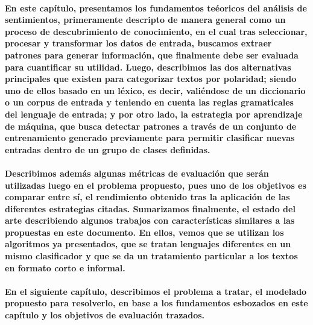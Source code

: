 \paragraph{En este cap\'itulo, presentamos los fundamentos te\'eoricos del an\'alisis de sentimientos, primeramente descripto de manera general como un proceso de descubrimiento de conocimiento, en el cual tras seleccionar, procesar y transformar los datos de entrada, buscamos extraer patrones para generar informaci\'on, que finalmente debe ser evaluada para cuantificar su utilidad. Luego, describimos las dos alternativas principales que existen para categorizar textos por polaridad; siendo uno de ellos basado en un l\'exico, es decir, vali\'endose de un diccionario o un corpus de entrada y teniendo en cuenta las reglas gramaticales del lenguaje de entrada; y por otro lado, la estrategia por aprendizaje de m\'aquina, que busca detectar patrones a trav\'es de un conjunto de entrenamiento generado previamente para permitir clasificar nuevas entradas dentro de un grupo de clases definidas.}
\paragraph{Describimos adem\'as algunas m\'etricas de evaluaci\'on que ser\'an utilizadas luego en  el problema propuesto, pues uno de los objetivos es comparar entre s\'i, el rendimiento obtenido tras la aplicaci\'on de las diferentes estrategias citadas. Sumarizamos finalmente, el estado del arte describiendo algunos trabajos con caracter\'isticas similares a las propuestas en este documento. En ellos, vemos que se utilizan los algoritmos ya presentados, que se tratan lenguajes diferentes en un mismo clasificador y que se da un tratamiento particular a los textos en formato corto e informal.}
\paragraph{En el siguiente cap\'itulo, describimos el problema a tratar, el modelado propuesto para resolverlo, en base a los fundamentos esbozados en este cap\'itulo y los objetivos de evaluaci\'on trazados.}
